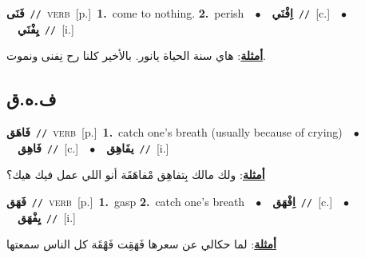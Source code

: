 \documentclass[10pt,a4paper,twoside]{article} %
\begin{document}
\begin{multicols}{2}
{\setlength\topsep{0pt}\textbf{\foreignlanguage{arabic}{فَنَى}}\ {\color{gray}\texttt{//}\color{black}}\ \textsc{verb}\ [p.]\ \textbf{1.}~come to nothing.  \textbf{2.}~perish\ \ $\bullet$\ \ \setlength\topsep{0pt}\textbf{\foreignlanguage{arabic}{اِفْنَي}}\ {\color{gray}\texttt{//}\color{black}}\ [c.]\ \ $\bullet$\ \ \setlength\topsep{0pt}\textbf{\foreignlanguage{arabic}{يِفْنَي}}\ {\color{gray}\texttt{//}\color{black}}\ [i.]\  \begin{flushright}\color{gray}\foreignlanguage{arabic}{\textbf{\underline{\foreignlanguage{arabic}{أمثلة}}}: هاي سنة الحياة يانور. بالأخير كلنا رح نِفنى ونموت.}\end{flushright}\color{black}} \vspace{2mm}

\vspace{-3mm}
\subsection*{\color{blue}\foreignlanguage{arabic}{ف.ه.ق}\color{blue}{}} 

{\setlength\topsep{0pt}\textbf{\foreignlanguage{arabic}{فَاهَق}}\ {\color{gray}\texttt{//}\color{black}}\ \textsc{verb}\ [p.]\ \textbf{1.}~catch one's breath (usually because of crying)\ \ $\bullet$\ \ \setlength\topsep{0pt}\textbf{\foreignlanguage{arabic}{فَاهِق}}\ {\color{gray}\texttt{//}\color{black}}\ [c.]\ \ $\bullet$\ \ \setlength\topsep{0pt}\textbf{\foreignlanguage{arabic}{يفَاهِق}}\ {\color{gray}\texttt{//}\color{black}}\ [i.]\  \begin{flushright}\color{gray}\foreignlanguage{arabic}{\textbf{\underline{\foreignlanguage{arabic}{أمثلة}}}: ولك مالك بِتفاهِق مْفاهَقَة أنو اللي عمل فيك هيك؟}\end{flushright}\color{black}} \vspace{2mm}

{\setlength\topsep{0pt}\textbf{\foreignlanguage{arabic}{فَهَق}}\ {\color{gray}\texttt{//}\color{black}}\ \textsc{verb}\ [p.]\ \textbf{1.}~gasp  \textbf{2.}~catch one's breath\ \ $\bullet$\ \ \setlength\topsep{0pt}\textbf{\foreignlanguage{arabic}{اِفْهَق}}\ {\color{gray}\texttt{//}\color{black}}\ [c.]\ \ $\bullet$\ \ \setlength\topsep{0pt}\textbf{\foreignlanguage{arabic}{يِفْهَق}}\ {\color{gray}\texttt{//}\color{black}}\ [i.]\  \begin{flushright}\color{gray}\foreignlanguage{arabic}{\textbf{\underline{\foreignlanguage{arabic}{أمثلة}}}: لما حكالي عن سعرها فَهَقِت فَهْقَة كل الناس سمعتها}\end{flushright}\color{black}} \vspace{2mm}


\end{multicols}
\end{document}
